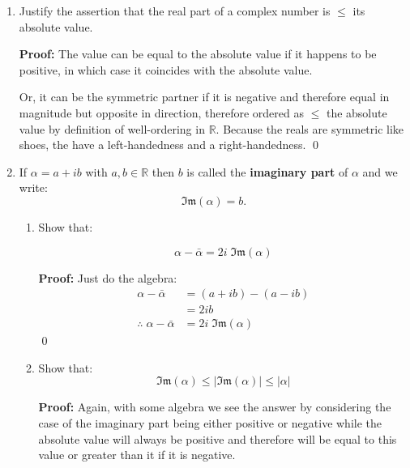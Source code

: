 \begin{enumerate}
	      Again, basically just some algebra of converting to the real and imaginary parts and gathering terms.
	      \qed

	\item Justify the assertion that the real part of a complex number is $\leq$ its absolute value.

	      \textbf{Proof:}
	      The value can be equal to the absolute value if it happens to be positive, in which case it coincides with
	      the absolute value.

	      Or, it can be the symmetric partner if it is negative and therefore equal in magnitude but opposite in direction,
	      therefore ordered as $\le$ the absolute value by definition of well-ordering in $\mathbb{R}$. Because the reals
	      are symmetric like shoes, the have a left-handedness and a right-handedness.
	      \qed

	\item If $\alpha = a + ib$ with $a, b \in \mathbb{R}$ then $b$ is called the \textbf{imaginary part} of $\alpha$
	      and we write:
	      $$\mathfrak{Im}(\alpha) = b.$$

	      \begin{enumerate}
		      \item Show that:

		            $$\alpha - \bar{\alpha} = 2i \; \mathfrak{Im}(\alpha)$$

		            \textbf{Proof:}
		            Just do the algebra:
		            \begin{align*}
			            \alpha - \bar{\alpha}               & = (a + ib) - (a - ib)         \\
			                                                & = 2ib                         \\
			            \therefore \; \alpha - \bar{\alpha} & = 2i \; \mathfrak{Im}(\alpha)
		            \end{align*}
		            \qed


		      \item Show that:
		            $$\mathfrak{Im}(\alpha) \leq \left | \mathfrak{Im}(\alpha) \right | \leq |\alpha|$$

		            \textbf{Proof:}
		            Again, with some algebra we see the answer by considering the case of the imaginary
		            part being either positive or negative while the absolute value will always be
		            positive and therefore will be equal to this value or greater than it if it is negative.


\end{enumerate}
\end{enumerate}
